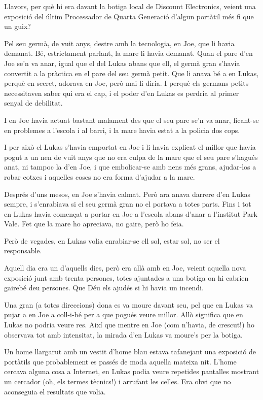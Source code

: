 Llavors, per què hi era davant la botiga local de Discount Electronics,
veient una exposició del últim Processador de Quarta Generació d'algun
portàtil més fi que un guix?

Pel seu germà, de vuit anys, destre amb la tecnologia, en Joe, que li
havia demanat. Bé, estrictament parlant, la mare li havia demanat. Quan
el pare d'en Joe se'n va anar, igual que el del Lukas abans que ell, el
germà gran s'havia convertit a la pràctica en el pare del seu germà
petit. Que li anava bé a en Lukas, perquè en secret, adorava en Joe,
però mai li diria. I perquè els germans petits necessitaven saber qui
era el cap, i el poder d'en Lukas es perdria al primer senyal de
debilitat.

I en Joe havia actuat bastant malament des que el seu pare se'n va anar,
ficant-se en problemes a l'escola i al barri, i la mare havia estat a la
policia dos cops.

I per això el Lukas s'havia emportat en Joe i li havia explicat el
millor que havia pogut a un nen de vuit anys que no era culpa de la mare
que el seu pare s'hagués anat, ni tampoc la d'en Joe, i que embolicar-se
amb nens més grans, ajudar-los a robar cotxes i aquelles coses no era
forma d'ajudar a la mare.

Després d'uns mesos, en Joe s'havia calmat. Però ara anava darrere d'en
Lukas sempre, i s'enrabiava si el seu germà gran no el portava a totes
parts. Fins i tot en Lukas havia començat a portar en Joe a l'escola
abans d'anar a l'institut Park Vale. Fet que la mare ho apreciava, no
gaire, però ho feia.

Però de vegades, en Lukas volia enrabiar-se ell sol, estar sol, no ser
el responsable.

Aquell dia era un d'aquells dies, però era allà amb en Joe, veient
aquella nova exposició junt amb trenta persones, totes ajuntades a una
botiga on hi cabrien gairebé deu persones. Que Déu els ajudés si hi
havia un incendi.

Una gran (a totes direccions) dona es va moure davant seu, pel que en
Lukas va pujar a en Joe a coll-i-bé per a que pogués veure millor. Allò
significa que en Lukas no podria veure res. Així que mentre en Joe (com
n'havia, de crescut!) ho observava tot amb intensitat, la mirada d'en
Lukas va moure's per la botiga.

Un home llargarut amb un vestit d'home blau estava tafanejant una
exposició de portàtils que probablement es passés de moda aquella
mateixa nit. L'home cercava alguna cosa a Internet, en Lukas podia veure
repetides pantalles mostrant un cercador (oh, els termes tècnics!) i
arrufant les celles. Era obvi que no aconseguia el resultats que volia.

